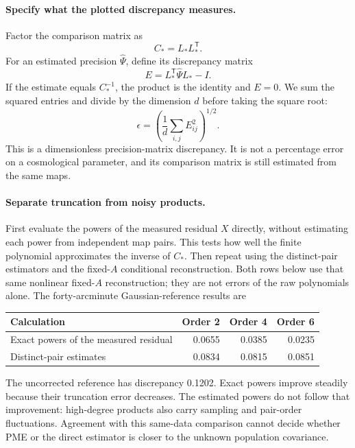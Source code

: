 \documentclass[11pt]{article}
\begin{document}
\paragraph{Specify what the plotted discrepancy measures.}
Factor the comparison matrix as
\begin{equation}
 C_*=L_*L_*^{\mathsf T}.
\end{equation}
For an estimated precision $\widehat\Psi$, define its discrepancy matrix
\begin{equation}
 E=L_*^{\mathsf T}\widehat\Psi L_*-I.
\end{equation}
If the estimate equals $C_*^{-1}$, the product is the identity and $E=0$.
We sum the squared entries and divide by the dimension $d$ before taking
the square root:
\begin{equation}
 \epsilon=\left(\frac{1}{d}\sum_{i,j}E_{ij}^2\right)^{1/2}.
\end{equation}
This is a dimensionless precision-matrix discrepancy. It is not a
percentage error on a cosmological parameter, and its comparison matrix
is still estimated from the same maps.

\paragraph{Separate truncation from noisy products.}
First evaluate the powers of the measured residual $X$ directly, without
estimating each power from independent map pairs. This tests how well the
finite polynomial approximates the inverse of $C_*$. Then repeat using
the distinct-pair estimators and the fixed-$A$ conditional reconstruction.
Both rows below use that same nonlinear fixed-$A$ reconstruction; they
are not errors of the raw polynomials alone. The forty-arcminute
Gaussian-reference results are
\begin{center}
\begin{tabular}{lrrr}
\toprule
Calculation & Order 2 & Order 4 & Order 6\\
\midrule
Exact powers of the measured residual & 0.0655 & 0.0385 & 0.0235\\
Distinct-pair estimates & 0.0834 & 0.0815 & 0.0851\\
\bottomrule
\end{tabular}
\end{center}
The uncorrected reference has discrepancy 0.1202. Exact powers improve
steadily because their truncation error decreases. The estimated powers
do not follow that improvement: high-degree products also carry sampling
and pair-order fluctuations. Agreement with this same-data comparison
cannot decide whether PME or the direct estimator is closer to the
unknown population covariance.
\end{document}
